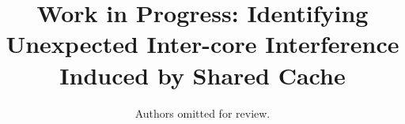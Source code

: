 \documentclass[10pt,conference]{IEEEtran}
\begin{document}
\newcommand\schim{SchIM\xspace}
\newcommand\schimL{Scheduler In-the-Middle\xspace}
\newcommand\schiml{scheduler in-the-middle\xspace}
\newcommand\axiin[1]{$\texttt{HPM}_{#1}$\xspace}
\newcommand\axiout[1]{$\texttt{HPS}_{#1}$\xspace}
\newcommand\axiconf[1]{$\texttt{LPM}_{#1}$\xspace}

\newcommand{\fig}[1]{Fig.~\ref{#1}}

\newcommand*\circledfig[2]{Fig.~\ref{#1}\tikz[baseline=0pt]{\node[anchor=south west,red,shape=circle,draw,inner sep=1pt] (char) {\scriptsize#2};}}

\newcommand*\circled[1]{\tikz[baseline=0pt]{\node[anchor=south west,red,shape=circle,draw,inner sep=1pt] (char) {\scriptsize#1};}}

\title{
    Work in Progress: Identifying Unexpected Inter-core Interference Induced by Shared Cache
}

\author{


    Authors omitted for review.
}
\end{document}
